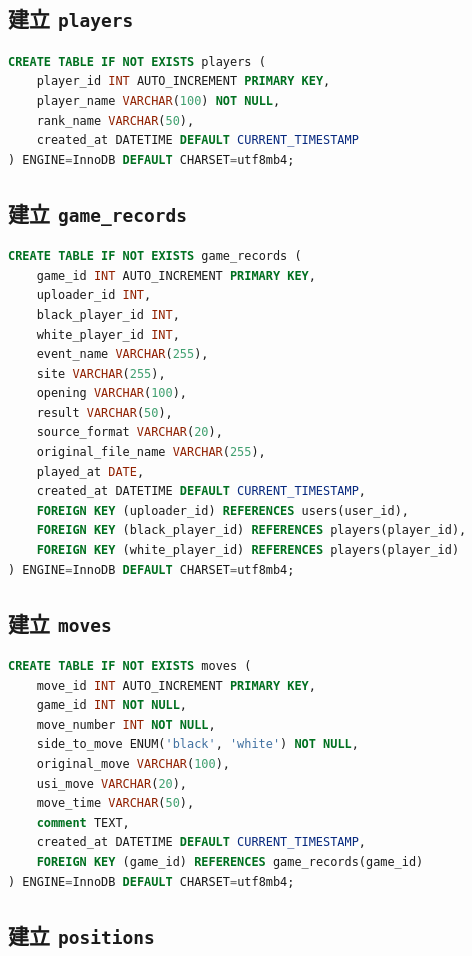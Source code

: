 \documentclass[12pt,a4paper,fontset=none]{ctexart}
\begin{document}
\subsection{建立 \texttt{players}}

\begin{lstlisting}[style=sqlstyle,language=SQL]
CREATE TABLE IF NOT EXISTS players (
    player_id INT AUTO_INCREMENT PRIMARY KEY,
    player_name VARCHAR(100) NOT NULL,
    rank_name VARCHAR(50),
    created_at DATETIME DEFAULT CURRENT_TIMESTAMP
) ENGINE=InnoDB DEFAULT CHARSET=utf8mb4;
\end{lstlisting}

\subsection{建立 \texttt{game\_records}}

\begin{lstlisting}[style=sqlstyle,language=SQL]
CREATE TABLE IF NOT EXISTS game_records (
    game_id INT AUTO_INCREMENT PRIMARY KEY,
    uploader_id INT,
    black_player_id INT,
    white_player_id INT,
    event_name VARCHAR(255),
    site VARCHAR(255),
    opening VARCHAR(100),
    result VARCHAR(50),
    source_format VARCHAR(20),
    original_file_name VARCHAR(255),
    played_at DATE,
    created_at DATETIME DEFAULT CURRENT_TIMESTAMP,
    FOREIGN KEY (uploader_id) REFERENCES users(user_id),
    FOREIGN KEY (black_player_id) REFERENCES players(player_id),
    FOREIGN KEY (white_player_id) REFERENCES players(player_id)
) ENGINE=InnoDB DEFAULT CHARSET=utf8mb4;
\end{lstlisting}

\subsection{建立 \texttt{moves}}

\begin{lstlisting}[style=sqlstyle,language=SQL]
CREATE TABLE IF NOT EXISTS moves (
    move_id INT AUTO_INCREMENT PRIMARY KEY,
    game_id INT NOT NULL,
    move_number INT NOT NULL,
    side_to_move ENUM('black', 'white') NOT NULL,
    original_move VARCHAR(100),
    usi_move VARCHAR(20),
    move_time VARCHAR(50),
    comment TEXT,
    created_at DATETIME DEFAULT CURRENT_TIMESTAMP,
    FOREIGN KEY (game_id) REFERENCES game_records(game_id)
) ENGINE=InnoDB DEFAULT CHARSET=utf8mb4;
\end{lstlisting}

\subsection{建立 \texttt{positions}}
\end{document}
